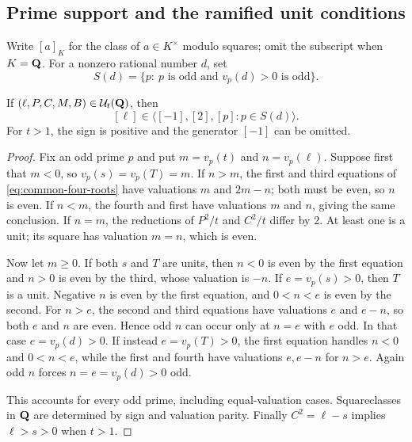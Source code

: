 \subsection{Prime support and the ramified unit conditions}

Write $[a]_K$ for the class of $a\in K^\times$ modulo squares; omit the
subscript when $K=\mathbf Q$.  For a nonzero rational number $d$, set
\[
 S(d)=\{p:\ p\text{ is odd and }v_p(d)>0\text{ is odd}\}.
\]

\begin{lemma}\label{lem:common-support}
If $(\ell,P,C,M,B)\in\mathcal U_t(\mathbf Q)$, then
\[
 [\ell]\in\langle[-1],[2],[p]:p\in S(d)\rangle.
\]
For $t>1$, the sign is positive and the generator $[-1]$ can be omitted.
\end{lemma}
\begin{proof}
Fix an odd prime $p$ and put $m=v_p(t)$ and $n=v_p(\ell)$.
Suppose first that $m<0$, so $v_p(s)=v_p(T)=m$.
If $n>m$, the first and third equations of
\eqref{eq:common-four-roots} have valuations $m$ and $2m-n$;
both must be even, so $n$ is even.  If $n<m$, the fourth and first
have valuations $m$ and $n$, giving the same conclusion.  If $n=m$,
the reductions of $P^2/t$ and $C^2/t$ differ by $2$.
At least one is a unit; its square has valuation $m=n$, which is even.

Now let $m\ge0$.  If both $s$ and $T$ are units, then $n<0$ is even
by the first equation and $n>0$ is even by the third, whose valuation
is $-n$.
If $e=v_p(s)>0$, then $T$ is a unit.  Negative $n$ is even by the
first equation, and $0<n<e$ is even by the second.  For $n>e$,
the second and third equations have valuations $e$ and $e-n$, so
both $e$ and $n$ are even.  Hence odd $n$ can occur only at
$n=e$ with $e$ odd.  In that case $e=v_p(d)>0$.
If instead $e=v_p(T)>0$, the first equation handles $n<0$ and
$0<n<e$, while the first and fourth have valuations $e,e-n$ for
$n>e$.  Again odd $n$ forces $n=e=v_p(d)>0$ odd.

This accounts for every odd prime, including equal-valuation cases.
Squareclasses in $\mathbf Q$ are determined by sign and valuation parity.
Finally $C^2=\ell-s$ implies $\ell>s>0$ when $t>1$.
\end{proof}


